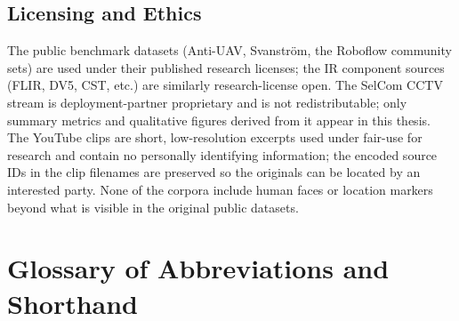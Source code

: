 \documentclass[12pt,a4paper,oneside,openright]{book}
\begin{document}
\section{Licensing and Ethics}

The public benchmark datasets (Anti-UAV, Svanstr\"om, the Roboflow community sets) are used under their published research licenses; the IR component sources (FLIR, DV5, CST, etc.) are similarly research-license open. The SelCom CCTV stream is deployment-partner proprietary and is not redistributable; only summary metrics and qualitative figures derived from it appear in this thesis. The YouTube clips are short, low-resolution excerpts used under fair-use for research and contain no personally identifying information; the encoded source IDs in the clip filenames are preserved so the originals can be located by an interested party. None of the corpora include human faces or location markers beyond what is visible in the original public datasets.

\chapter{Glossary of Abbreviations and Shorthand}
\label{app:glossary}
\end{document}

